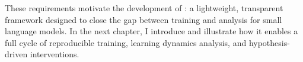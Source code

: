 These requirements motivate the development of \pico: a lightweight, transparent framework designed to close the gap between training and analysis for small language models. In the next chapter, I introduce \pico and illustrate how it enables a full cycle of reproducible training, learning dynamics analysis, and hypothesis-driven interventions.


